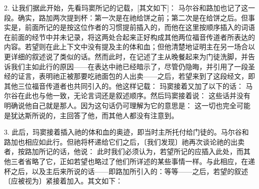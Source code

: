 2. 让我们据此开始，先看玛窦所记的记载，[其文如下]： 马尔谷和路加也记了这一段。确实，路加两次提到杯：第一次是在祂给饼之前；第二次是在给饼之后。但事实是，前面所记的是按这位作者的习惯提前插入的，而他在这里按顺序插入的词语在前面的经节中并未记录，将这两处合起来正好构成其他两位福音传道者所表达的内容。若望则在此上下文中没有提及主的体和血；但他清楚地证明主在另一场合以更详细的叙述说了类似的话。然而此时，在记述了主从晚餐起来为门徒洗脚，并告诉我们主如此行的原因——在表达中祂已经暗示了，尽管仍隐晦，并引用了一段圣经的证言，表明祂正被那要吃祂面包的人出卖——之后，若望来到了这段经文，即其他三位福音传道者也共同引入的。他这样记载：  玛窦接着又加了以下的话： 马尔谷在此也与他一致，无论言词还是叙述顺序。然后玛窦接着说： 这些话并没有明确说他自己就是那人。因为这句话仍可理解为它的意思是： 这一切也完全可能是犹达斯所说的，主回答了他，而其他人都没有注意到。\par

3. 此后，玛窦接着插入祂的体和血的奥迹，即当时主所托付给门徒的。马尔谷和路加也相应如此行。但祂将杯递给它们之后，〔我们发现〕祂再次谈论祂的出卖者，按路加所记的话，他说： 此时我们必须认为，若望所记的应插入此处，而其他三者省略了它，正如若望也略过了他们所详述的某些事情一样。与此相应，在递杯之后，以及主后来所说的话——即路加所引入的：等等——之后，若望的叙述〔应被视为〕紧接着加入。其文如下：\par

